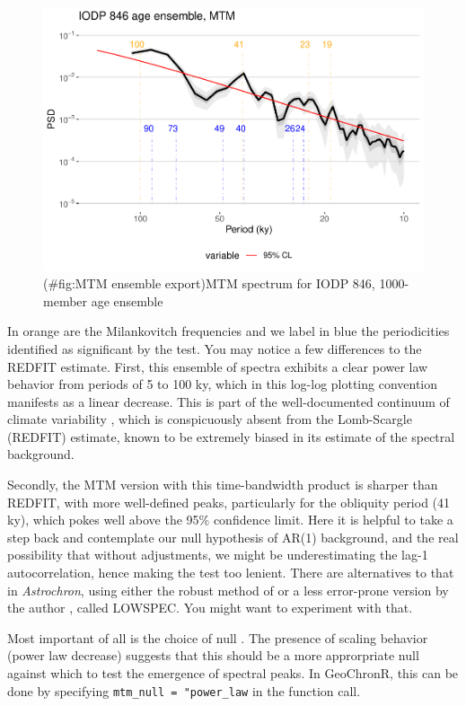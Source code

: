 \documentclass[gc, manuscript]{copernicus}
\begin{document}
\begin{figure}
\centering
\includegraphics{geoChronR-paper_files/figure-latex/MTM ensemble export-1.pdf}
\caption{(\#fig:MTM ensemble export)MTM spectrum for IODP 846, 1000-member age ensemble}
\end{figure}

In orange are the Milankovitch frequencies and we label in blue the periodicities identified as significant by the test. You may notice a few differences to the REDFIT estimate. First, this ensemble of spectra exhibits a clear power law behavior from periods of 5 to 100 ky, which in this log-log plotting convention manifests as a linear decrease. This is part of the well-documented continuum of climate variability \citep[\citet{ZhuPNAS2019}]{Huybers_Curry2006}, which is conspicuously absent from the Lomb-Scargle (REDFIT) estimate, known to be extremely biased in its estimate of the spectral background.

Secondly, the MTM version with this time-bandwidth product is sharper than REDFIT, with more well-defined peaks, particularly for the obliquity period (41 ky), which pokes well above the 95\% confidence limit. Here it is helpful to take a step back and contemplate our null hypothesis of AR(1) background, and the real possibility that without adjustments, we might be underestimating the lag-1 autocorrelation, hence making the test too lenient. There are alternatives to that in \emph{Astrochron}, using either the robust method of \citet{MannLees96} or a less error-prone version by the author \citep{Meyers_2012}, called LOWSPEC. You might want to experiment with that.

Most important of all is the choice of null \citep{Vaughan_PP2011}. The presence of scaling behavior (power law decrease) suggests that this should be a more approrpriate null against which to test the emergence of spectral peaks. In GeoChronR, this can be done by specifying \texttt{mtm\_null\ =\ "power\_law} in the function call.
\end{document}
